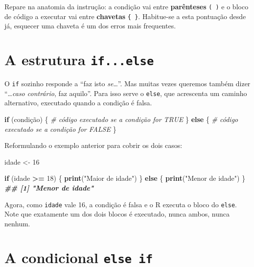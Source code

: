 \documentclass[
  portuguese,
  11pt,
  openany]{book}
\newenvironment{Shaded}{\begin{snugshade}}{\end{snugshade}}
\newcommand{\CommentTok}[1]{\textcolor[rgb]{0.56,0.35,0.01}{\textit{#1}}}
\newcommand{\ControlFlowTok}[1]{\textcolor[rgb]{0.13,0.29,0.53}{\textbf{#1}}}
\newcommand{\DecValTok}[1]{\textcolor[rgb]{0.00,0.00,0.81}{#1}}
\newcommand{\DocumentationTok}[1]{\textcolor[rgb]{0.56,0.35,0.01}{\textbf{\textit{#1}}}}
\newcommand{\FunctionTok}[1]{\textcolor[rgb]{0.13,0.29,0.53}{\textbf{#1}}}
\newcommand{\NormalTok}[1]{#1}
\newcommand{\OtherTok}[1]{\textcolor[rgb]{0.56,0.35,0.01}{#1}}
\newcommand{\SpecialCharTok}[1]{\textcolor[rgb]{0.81,0.36,0.00}{\textbf{#1}}}
\newcommand{\StringTok}[1]{\textcolor[rgb]{0.31,0.60,0.02}{#1}}
\begin{document}
Repare na anatomia da instrução: a condição vai entre \textbf{parênteses} \texttt{(\ )} e o
bloco de código a executar vai entre \textbf{chavetas} \texttt{\{\ \}}. Habitue-se a esta
pontuação desde já, esquecer uma chaveta é um dos erros mais frequentes.

\section{\texorpdfstring{A estrutura \texttt{if...else}}{A estrutura if...else}}\label{a-estrutura-if...else}

O \texttt{if} sozinho responde a ``faz isto \emph{se}\ldots{}''. Mas muitas vezes queremos também
dizer ``\ldots{}\emph{caso contrário}, faz aquilo''. Para isso serve o \texttt{else}, que
acrescenta um caminho alternativo, executado quando a condição é falsa.

\begin{Shaded}
\begin{Highlighting}[]
\ControlFlowTok{if}\NormalTok{ (condição) \{}
  \CommentTok{\# código executado se a condição for TRUE}
\NormalTok{\} }\ControlFlowTok{else}\NormalTok{ \{}
  \CommentTok{\# código executado se a condição for FALSE}
\NormalTok{\}}
\end{Highlighting}
\end{Shaded}

Reformulando o exemplo anterior para cobrir os dois casos:

\begin{Shaded}
\begin{Highlighting}[]
\NormalTok{idade }\OtherTok{\textless{}{-}} \DecValTok{16}

\ControlFlowTok{if}\NormalTok{ (idade }\SpecialCharTok{\textgreater{}=} \DecValTok{18}\NormalTok{) \{}
  \FunctionTok{print}\NormalTok{(}\StringTok{"Maior de idade"}\NormalTok{)}
\NormalTok{\} }\ControlFlowTok{else}\NormalTok{ \{}
  \FunctionTok{print}\NormalTok{(}\StringTok{"Menor de idade"}\NormalTok{)}
\NormalTok{\}}
\DocumentationTok{\#\# [1] "Menor de idade"}
\end{Highlighting}
\end{Shaded}

Agora, como \texttt{idade} vale 16, a condição é falsa e o R executa o bloco do \texttt{else}.
Note que exatamente um dos dois blocos é executado, nunca ambos, nunca nenhum.

\section{\texorpdfstring{A condicional \texttt{else\ if}}{A condicional else if}}\label{a-condicional-else-if}
\end{document}
